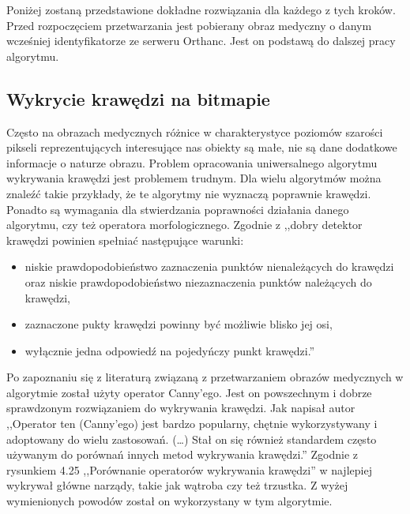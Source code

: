 \documentclass[a4paper,11pt,twoside]{report}
\theoremstyle{definition}
\begin{document}
Poniżej zostaną przedstawione dokładne rozwiązania dla każdego z tych kroków. Przed rozpoczęciem przetwarzania jest pobierany obraz medyczny o danym wcześniej identyfikatorze ze serweru Orthanc. Jest on podstawą do dalszej pracy algorytmu.


\subsection {Wykrycie krawędzi na bitmapie}

Często na obrazach medycznych różnice w charakterystyce poziomów szarości pikseli reprezentujących interesujące nas obiekty są małe, nie są dane dodatkowe informacje o naturze obrazu. Problem opracowania uniwersalnego algorytmu wykrywania krawędzi jest problemem trudnym. Dla wielu algorytmów można znaleźć takie przykłady, że te algorytmy nie wyznaczą poprawnie krawędzi. Ponadto są wymagania dla stwierdzania poprawności działania danego algorytmu, czy też operatora morfologicznego. Zgodnie z \cite{Cyfrowe przetwarzanie obrazów medycznych} ,,dobry detektor krawędzi powinien spełniać następujące warunki:
\begin{itemize}[noitemsep]
\item {niskie prawdopodobieństwo zaznaczenia punktów nienależących do krawędzi oraz niskie prawdopodobieństwo niezaznaczenia punktów należących do krawędzi,}
\item {zaznaczone pukty krawędzi powinny być możliwie blisko jej osi,}
\item {wyłącznie jedna odpowiedź na pojedyńczy punkt krawędzi.''}
\end{itemize}

Po zapoznaniu się z literaturą związaną z przetwarzaniem obrazów medycznych w algorytmie został użyty operator Canny'ego. Jest on powszechnym i dobrze sprawdzonym rozwiązaniem do wykrywania krawędzi. Jak napisał autor \cite{Cyfrowe przetwarzanie obrazów medycznych} ,,Operator ten (Canny'ego) jest bardzo popularny, chętnie wykorzystywany i adoptowany do wielu zastosowań. (\dots) Stał on się również standardem często używanym do porównań innych metod wykrywania krawędzi.'' Zgodnie z rysunkiem 4.25 ,,Porównanie operatorów wykrywania krawędzi'' w \cite{Cyfrowe przetwarzanie obrazów medycznych} najlepiej wykrywał główne narządy, takie jak wątroba czy też trzustka. Z wyżej wymienionych powodów został on wykorzystany w tym algorytmie.
\end{document}

